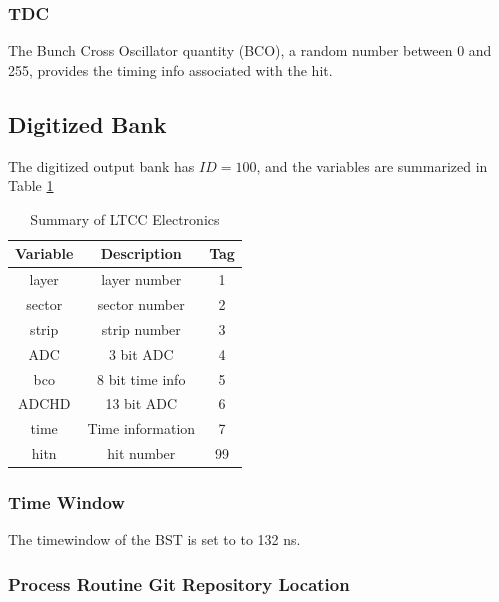 \subsubsection{TDC}
The Bunch Cross Oscillator quantity (BCO), a random number between 0 and 255,
provides the timing info associated with the hit.

\subsection{Digitized Bank}
The digitized output bank has $ID=100$, and the variables are summarized in Table \ref{tab:bstBank}

\begin{table}[h]
	\begin{center}
		\begin{tabular}{| c | c | c |}
			\hline \hline
			Variable         & Description  & Tag  \\
			\hline
               layer  &                                      layer number  &    1   \\
              sector  &                                     sector number  &    2   \\
               strip  &                                      strip number  &    3   \\
                 ADC  &                                         3 bit ADC  &    4   \\
                 bco  &                                   8 bit time info  &    5   \\
               ADCHD  &                                        13 bit ADC  &    6   \\
                time  &                                  Time information  &    7   \\
                hitn  &                                        hit number  &   99   \\
			\hline \hline
		\end{tabular}
	\end{center}
	\caption{Summary of LTCC Electronics}\label{tab:bstBank}
\end{table}


\subsubsection{Time Window}
The timewindow of the BST is set to to 132 ns.

\subsubsection{Process Routine Git Repository Location}

